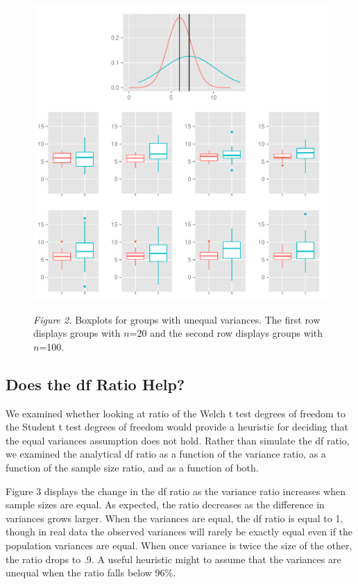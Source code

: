 \documentclass[man,a4paper,noextraspace,apacite]{apa6}\usepackage[]{graphicx}\usepackage[]{color}
\makeatletter
\def\maxwidth{ %
  \ifdim\Gin@nat@width>\linewidth
    \linewidth
  \else
    \Gin@nat@width
  \fi
}
\newenvironment{knitrout}{}{} %
\makeatother
\begin{document}
\begin{figure}
\begin{knitrout}
\color{fgcolor}
\includegraphics[width=\maxwidth]{figure/varDifferentBoxplots} 

\end{knitrout}
\textit{Figure 2.} Boxplots for groups with unequal variances. The first row displays groups with $n$=20 and the second row displays groups with $n$=100.
\end{figure}


\subsection{Does the df Ratio Help?}
    We examined whether looking at ratio of the Welch t test degrees of freedom to the Student t test degrees of freedom would provide a heuristic for deciding that the equal variances assumption does not hold. Rather than simulate the df ratio, we examined the analytical df ratio as a function of the variance ratio, as a function of the sample size ratio, and as a function of both. 

    Figure 3 displays the change in the df ratio as the variance ratio increases when sample sizes are equal. As expected, the ratio decreases as the difference in variances grows larger. When the variances are equal, the df ratio is equal to 1, though in real data the observed variances will rarely be exactly equal even if the population variances are equal. When once variance is twice the size of the other, the ratio drops to .9. A useful heuristic might to assume that the variances are unequal when the ratio falls below 96\%.
  
\end{document}
